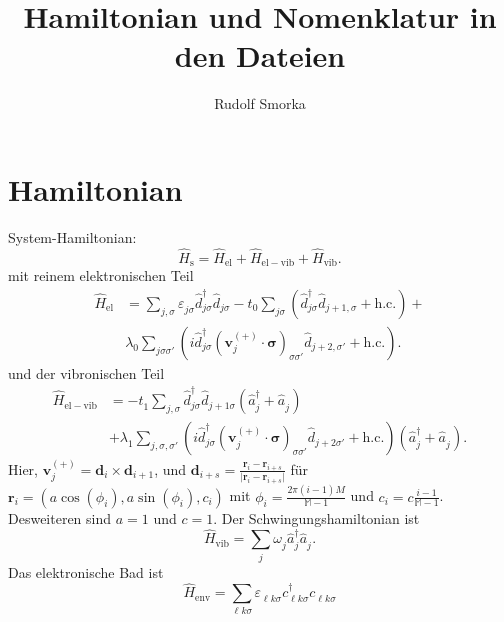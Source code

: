 \documentclass{article}
\renewcommand{\vec}[1]{\mathbf{#1}}
\newcommand{\pdagger}{{\phantom{\dagger}}}
\begin{document}
\title{Hamiltonian und Nomenklatur in den Dateien}
\author{Rudolf Smorka}
\maketitle
\section{Hamiltonian}
System-Hamiltonian:
\begin{equation}
	\hat{H}_\mathrm{s} = \hat{H}_\mathrm{el} + \hat{H}_\mathrm{el-vib} + \hat{H}_\mathrm{vib}.  \label{eq:H_s}
\end{equation}
mit reinem elektronischen Teil
\begin{equation}
	\begin{split}
		\hat{H}_\mathrm{el} &= \sum_{j,\sigma} \varepsilon_{j\sigma}^\pdagger \hat{d}_{j\sigma}^\dagger \hat{d}_{j\sigma}^\pdagger - t_0 \sum_{j\sigma} (\hat{d}_{j\sigma}^\dagger \hat{d}_{j+1,\sigma}^\pdagger + \mathrm{h.c.}) +\\& \lambda_0^\pdagger\sum_{j\sigma\sigma'} (i\hat{d}_{j\sigma}^\dagger (\vec{v}_j^{(+)}\cdot \bm{\sigma})_{\sigma\sigma'}^\pdagger \hat{d}_{j+2,\sigma'}^\pdagger + \mathrm{h.c.}).\label{eq:H_el}
	\end{split}
\end{equation}
und der vibronischen Teil
\begin{align}
	\hat{H}_\mathrm{el-vib} &= - t_1^\pdagger \sum_{j,\sigma}  \hat{d}_{j\sigma}^\dagger \hat{d}_{j+1\sigma}^\pdagger (\hat{a}_{j}^\dagger + \hat{a}_{j}^\pdagger) \\ & + \lambda_1^\pdagger\sum_{j,\sigma,\sigma'} (i \hat{d}_{j\sigma}^\dagger (\vec{v}_j^{(+)} \cdot \bm{\sigma})_{\sigma\sigma'}^\pdagger \hat{d}_{j+2\sigma'}^\pdagger +\mathrm{h.c.})(\hat{a}_{j}^\dagger + \hat{a}_{j}^\pdagger).\label{eq:H_el-vib}
\end{align}
Hier, $\vec{v}^{(+)}_j = \vec{d}_i\times \vec{d}_{i+1}$, und $\vec{d}_{i+s} = \frac{\vec{r}_i - \vec{r}_{i+s}}{\vert \vec{r}_i - \vec{r}_{i+s}\vert}$ für $\vec{r}_i = (a\cos (\phi_i), a\sin(\phi_i),c_i)$ mit $\phi_i = \frac{2\pi(i-1)M}{\mathbb{M}-1}$ und $c_i = c\frac{i-1}{\mathbb{M}-1}$. Desweiteren sind $a=1$ und $c=1$. 
Der Schwingungshamiltonian ist
\begin{equation}
	\hat{H}_\mathrm{vib} = \sum_{j} \omega_{j}^\pdagger \hat{a}_{j}^\dagger \hat{a}_{j}^\pdagger.
	\label{eq:H_vib} 
\end{equation}
Das elektronische Bad ist
\begin{equation}
	\hat{H}_\mathrm{env} = \sum_{\ell k\sigma} \varepsilon_{\ell k\sigma}^\pdagger c_{\ell k\sigma}^\dagger c_{\ell k\sigma}^\pdagger \label{eq:LeadHamiltonian}
\end{equation}
\end{document}
